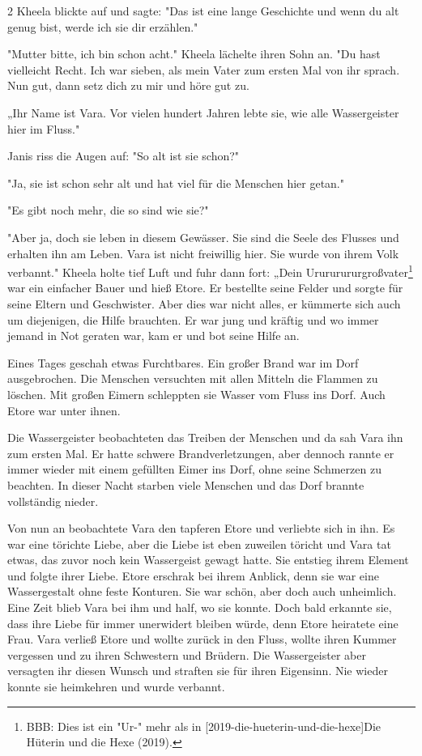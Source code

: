 \documentclass[10pt, a4paper, oneside]{book}
\begin{document}
\begin{multicols}{2}
Kheela blickte auf und sagte: "Das ist eine lange Geschichte und wenn du alt genug bist, werde ich sie dir erzählen."

"Mutter bitte, ich bin schon acht." Kheela lächelte ihren Sohn an. "Du hast vielleicht Recht. Ich war sieben, als mein Vater zum ersten Mal von ihr sprach. Nun gut, dann setz dich zu mir und höre gut zu.

„Ihr Name ist Vara. Vor vielen hundert Jahren lebte sie, wie alle Wassergeister hier im Fluss."

Janis riss die Augen auf: "So alt ist sie schon?"

"Ja, sie ist schon sehr alt und hat viel für die Menschen hier getan."

"Es gibt noch mehr, die so sind wie sie?"

"Aber ja, doch sie leben in diesem Gewässer. Sie sind die Seele des Flusses und erhalten ihn am Leben. Vara ist nicht freiwillig hier. Sie wurde von ihrem Volk verbannt." Kheela holte tief Luft und fuhr dann fort: „Dein Urururururgroßvater\footnote{BBB: Dies ist ein "Ur-" mehr als in [2019-die-hueterin-und-die-hexe]{Die Hüterin und die Hexe (2019)}.} war ein einfacher Bauer und hieß Etore. Er bestellte seine Felder und sorgte für seine Eltern und Geschwister. Aber dies war nicht alles, er kümmerte sich auch um diejenigen, die Hilfe brauchten. Er war jung und kräftig und wo immer jemand in Not geraten war, kam er und bot seine Hilfe an.

Eines Tages geschah etwas Furchtbares. Ein großer Brand war im Dorf ausgebrochen. Die Menschen versuchten mit allen Mitteln die Flammen zu löschen. Mit großen Eimern schleppten sie Wasser vom Fluss ins Dorf. Auch Etore war unter ihnen.\bigskip

Die Wassergeister beobachteten das Treiben der Menschen und da sah Vara ihn zum ersten Mal. Er hatte schwere Brandverletzungen, aber dennoch rannte er immer wieder mit einem gefüllten Eimer ins Dorf, ohne seine Schmerzen zu beachten. In dieser Nacht starben viele Menschen und das Dorf brannte vollständig nieder.

Von nun an beobachtete Vara den tapferen Etore und verliebte sich in ihn. Es war eine törichte Liebe, aber die Liebe ist eben zuweilen töricht und Vara tat etwas, das zuvor noch kein Wassergeist gewagt hatte. Sie entstieg ihrem Element und folgte ihrer Liebe. Etore erschrak bei ihrem Anblick, denn sie war eine Wassergestalt ohne feste Konturen. Sie war schön, aber doch auch unheimlich. Eine Zeit blieb Vara bei ihm und half, wo sie konnte. Doch bald erkannte sie, dass ihre Liebe für immer unerwidert bleiben würde, denn Etore heiratete eine Frau. Vara verließ Etore und wollte zurück in den Fluss, wollte ihren Kummer vergessen und zu ihren Schwestern und Brüdern. Die Wassergeister aber versagten ihr diesen Wunsch und straften sie für ihren Eigensinn. Nie wieder konnte sie heimkehren und wurde verbannt.\bigskip


\end{multicols}
\end{document}
